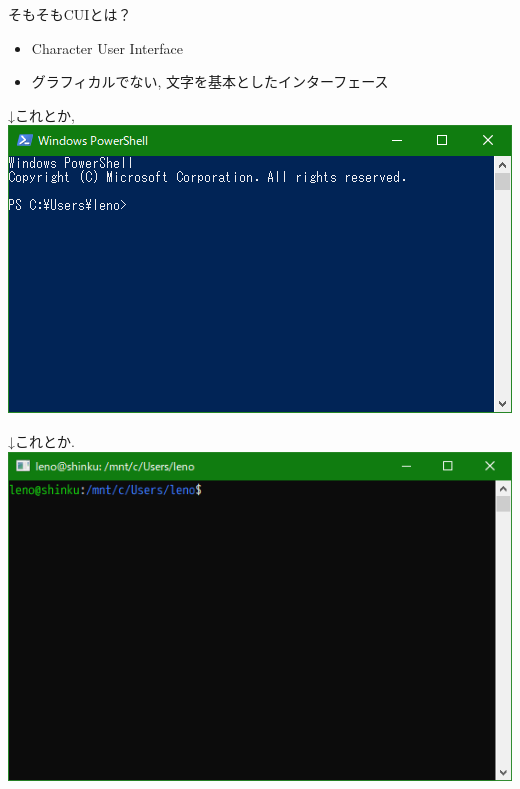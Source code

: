 \documentclass[uplatex, dvipdfmx, unicode]{beamer}
\begin{document}
\begin{frame}
  そもそもCUIとは？
  \begin{itemize}
    \item{Character User Interface}
    \item{グラフィカルでない, 文字を基本としたインターフェース}
  \end{itemize}
\end{frame}

\begin{frame}
  \centering
  \Huge{↓これとか,} \\

  \includegraphics[keepaspectratio, scale=.5]{./img/ps.png}
\end{frame}

\begin{frame}
  \centering
  \Huge{↓これとか.} \\

  \includegraphics[keepaspectratio, scale=.5]{./img/bash.png}
\end{frame}
\end{document}

